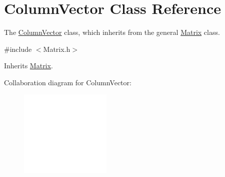 \hypertarget{class_column_vector}{
\section{ColumnVector Class Reference}
\label{class_column_vector}
}


The \hyperlink{class_column_vector}{ColumnVector} class, which inherits from the general \hyperlink{class_matrix}{Matrix} class.  




{\ttfamily \#include $<$Matrix.h$>$}



Inherits \hyperlink{class_matrix}{Matrix}.



Collaboration diagram for ColumnVector:\nopagebreak
\begin{figure}[H]
\begin{center}
\leavevmode
\includegraphics[width=124pt]{class_column_vector__coll__graph}
\end{center}
\end{figure}
